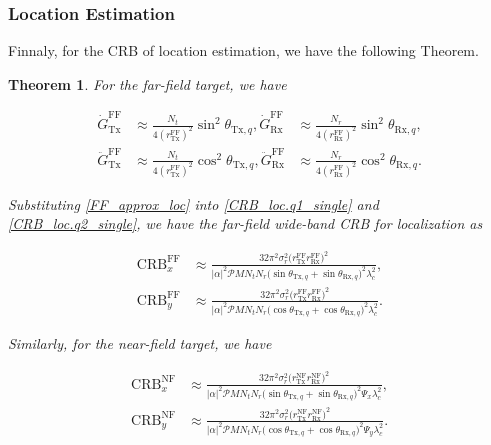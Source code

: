 \documentclass[9pt,final,journal,twocolumn]{IEEEtran}
\newtheorem{theorem}{Theorem}
\begin{document}
\subsubsection{Location Estimation} Finnaly, for the CRB of location estimation, we have the following Theorem.
\begin{theorem}
For the far-field target, we have
\begin{small}
\begin{subequations} \label{FF_approx_loc}
\begin{align}
\dot{G}^{\mathrm{FF}}_{\mathrm{Tx}} 
&\approx \frac{N_t}{4 (r^{\mathrm{FF}}_{\mathrm{Tx}})^{2}} \sin^{2}\theta_{\mathrm{Tx},q},
\dot{G}^{\mathrm{FF}}_{\mathrm{Rx}} 
&\approx \frac{N_r}{4 (r^{\mathrm{FF}}_{\mathrm{Rx}})^{2}} \sin^{2}\theta_{\mathrm{Rx},q}, \\
\ddot{G}^{\mathrm{FF}}_{\mathrm{Tx}}
&\approx \frac{N_t}{4 (r^{\mathrm{FF}}_{\mathrm{Tx}})^{2}} \cos^{2}\theta_{\mathrm{Tx},q},
\ddot{G}^{\mathrm{FF}}_{\mathrm{Rx}}
&\approx \frac{N_r}{4 (r^{\mathrm{FF}}_{\mathrm{Rx}})^{2}} \cos^{2}\theta_{\mathrm{Rx},q}.
\end{align}
\end{subequations}
\end{small}
\noindent\hspace{-0.5em}Substituting \eqref{FF_approx_loc} into \eqref{CRB_loc.q1_single} and  \eqref{CRB_loc.q2_single}, we have the far-field wide-band CRB for localization as  
\begin{small}
\begin{subequations}
\label{CRB_loc_FF_NB}
\begin{align}
\mathrm{CRB}_{x}^{\mathrm{FF}}
&\approx
\frac{32\pi^2\sigma_r^2
\big(r_{\mathrm{Tx}}^{\mathrm{FF}}r_{\mathrm{Rx}}^{\mathrm{FF}}\big)^2}
{|\alpha|^2\mathcal PMN_tN_r
\Big(\sin\theta_{\mathrm{Tx},q}+\sin\theta_{\mathrm{Rx},q}\Big)^2
\lambda_c^2},\\
\mathrm{CRB}_{y}^{\mathrm{FF}}
&\approx
\frac{32\pi^2\sigma_r^2
\big(r_{\mathrm{Tx}}^{\mathrm{FF}}r_{\mathrm{Rx}}^{\mathrm{FF}}\big)^2}
{|\alpha|^2\mathcal PMN_tN_r
\Big(\cos\theta_{\mathrm{Tx},q}+\cos\theta_{\mathrm{Rx},q}\Big)^2
\lambda_c^2}.
\end{align}
\end{subequations}
\end{small}
Similarly, for the near-field target, we have 
\begin{small}
\begin{subequations}
\label{CRB_loc_NF_NB}
\begin{align}
\mathrm{CRB}_{x}^{\mathrm{NF}}
&\approx
\frac{32\pi^2\sigma_r^2
\big(r_{\mathrm{Tx}}^{\mathrm{NF}}r_{\mathrm{Rx}}^{\mathrm{NF}}\big)^2}
{|\alpha|^2\mathcal PMN_tN_r
\Big(\sin\theta_{\mathrm{Tx},q}+\sin\theta_{\mathrm{Rx},q}\Big)^2
\Psi_x\lambda_c^2},\\
\mathrm{CRB}_{y}^{\mathrm{NF}}
&\approx
\frac{32\pi^2\sigma_r^2
\big(r_{\mathrm{Tx}}^{\mathrm{NF}}r_{\mathrm{Rx}}^{\mathrm{NF}}\big)^2}
{|\alpha|^2\mathcal PMN_tN_r
\Big(\cos\theta_{\mathrm{Tx},q}+\cos\theta_{\mathrm{Rx},q}\Big)^2
\Psi_y\lambda_c^2}.
\end{align}
\end{subequations}
\end{small} 
\end{theorem}
\end{document}

